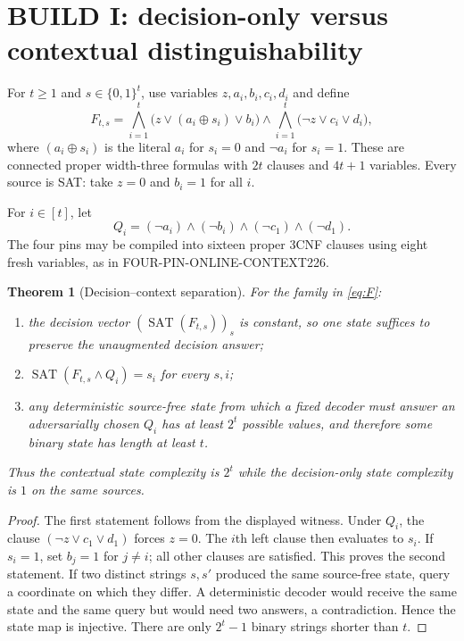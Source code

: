 \documentclass[11pt]{article}
\newtheorem{theorem}{Theorem}
\begin{document}
\section{BUILD I: decision-only versus contextual distinguishability}
For $t\ge1$ and $s\in\{0,1\}^t$, use variables
$z,a_i,b_i,c_i,d_i$ and define
\begin{equation}\label{eq:F}
 F_{t,s}=\bigwedge_{i=1}^t
 \bigl(z\lor(a_i\oplus s_i)\lor b_i\bigr)
 \land\bigwedge_{i=1}^t
 \bigl(\neg z\lor c_i\lor d_i\bigr),
\end{equation}
where $(a_i\oplus s_i)$ is the literal $a_i$ for $s_i=0$ and
$\neg a_i$ for $s_i=1$.  These are connected proper width-three formulas
with $2t$ clauses and $4t+1$ variables.  Every source is SAT: take $z=0$ and
$b_i=1$ for all $i$.

For $i\in[t]$, let
\[
 Q_i=(\neg a_i)\land(\neg b_i)\land(\neg c_1)\land(\neg d_1).
\]
The four pins may be compiled into sixteen proper 3CNF clauses using eight
fresh variables, as in FOUR-PIN-ONLINE-CONTEXT226.

\begin{theorem}[Decision--context separation]\label{thm:sep}
For the family in \eqref{eq:F}:
\begin{enumerate}
\item the decision vector $(\operatorname{SAT}(F_{t,s}))_s$ is constant, so
one state suffices to preserve the unaugmented decision answer;
\item $\operatorname{SAT}(F_{t,s}\land Q_i)=s_i$ for every $s,i$;
\item any deterministic source-free state from which a fixed decoder must
answer an adversarially chosen $Q_i$ has at least $2^t$ possible values, and
therefore some binary state has length at least $t$.
\end{enumerate}
Thus the contextual state complexity is $2^t$ while the decision-only state
complexity is $1$ on the same sources.
\end{theorem}
\begin{proof}
The first statement follows from the displayed witness.  Under $Q_i$, the
clause $(\neg z\lor c_1\lor d_1)$ forces $z=0$.  The $i$th left clause then
evaluates to $s_i$.  If $s_i=1$, set $b_j=1$ for $j\ne i$; all other clauses
are satisfied.  This proves the second statement.  If two distinct strings
$s,s'$ produced the same source-free state, query a coordinate on which they
differ.  A deterministic decoder would receive the same state and the same
query but would need two answers, a contradiction.  Hence the state map is
injective.  There are only $2^t-1$ binary strings shorter than $t$.
\end{proof}
\end{document}
